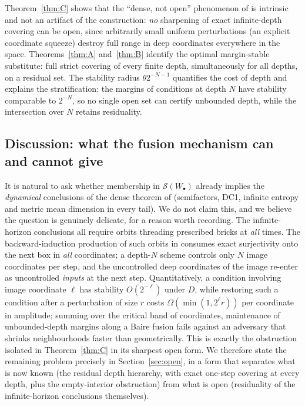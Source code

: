 \documentclass[11pt]{article}
\begin{document}
Theorem~\ref{thm:C} shows that the ``dense, not open'' phenomenon of
\cite{Shmalo2026} is intrinsic and not an artifact of the construction: \emph{no}
sharpening of exact infinite-depth covering can be open, since arbitrarily small
uniform perturbations (an explicit coordinate squeeze) destroy full range in deep
coordinates everywhere in the space.  Theorems~\ref{thm:A} and~\ref{thm:B} identify
the optimal margin-stable substitute: full strict covering of every finite depth,
simultaneously for all depths, on a residual set.  The stability radius
$\theta2^{-N-1}$ quantifies the cost of depth and explains the stratification: the
margins of conditions at depth $N$ have stability comparable to $2^{-N}$, so no single
open set can certify unbounded depth, while the intersection over $N$ retains
residuality.

\subsection*{Discussion: what the fusion mechanism can and cannot give}

It is natural to ask whether membership in $\mathcal S(W_\bullet)$ already implies the
\emph{dynamical} conclusions of the dense theorem of \cite{Shmalo2026} (semifactors,
DC1, infinite entropy and metric mean dimension in every tail).  We do not claim this,
and we believe the question is genuinely delicate, for a reason worth recording.  The
infinite-horizon conclusions all require orbits threading prescribed bricks at
\emph{all} times.  The backward-induction production of such orbits in
\cite{Shmalo2026} consumes exact surjectivity onto the next box in \emph{all}
coordinates; a depth-$N$ scheme controls only $N$ image coordinates per step, and the
uncontrolled deep coordinates of the image re-enter as uncontrolled \emph{inputs} at
the next step.  Quantitatively, a condition involving image coordinate $\ell$ has
stability $O(2^{-\ell})$ under $D$, while restoring such a condition after a
perturbation of size $r$ costs $\Omega(\min(1,2^{\ell}r))$ per coordinate in amplitude;
summing over the critical band of coordinates, maintenance of unbounded-depth margins
along a Baire fusion fails against an adversary that shrinks neighbourhoods faster
than geometrically.  This is exactly the obstruction isolated in
Theorem~\ref{thm:C} in its sharpest open form.  We therefore state the remaining
problem precisely in Section~\ref{sec:open}, in a form that separates what is now
known (the residual depth hierarchy, with exact one-step covering at every depth, plus
the empty-interior obstruction) from what is open (residuality of the infinite-horizon
conclusions themselves).
\end{document}
